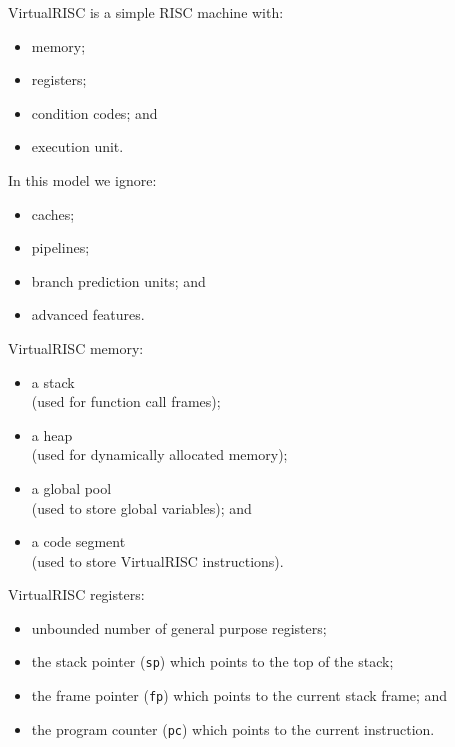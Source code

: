 \begin{slide*}
VirtualRISC is a simple RISC machine with:
\begin{itemize}
\item memory;
\item registers;
\item condition codes; and
\item execution unit.
\end{itemize}

In this model we ignore:
\begin{itemize}
\item caches;
\item pipelines;
\item branch prediction units; and
\item advanced features.
\end{itemize}


\vfil
\end{slide*}

\begin{slide*}
VirtualRISC memory:
\begin{itemize}
\item a stack\\(used for function call frames);
\item a heap\\ (used for dynamically allocated memory);
\item a global pool\\(used to store global variables); and
\item a code segment\\(used to store VirtualRISC instructions).
\end{itemize}
\vfil
\end{slide*}

\begin{slide*}
VirtualRISC registers:
\begin{itemize}
\item unbounded number of general purpose registers;
\item the stack pointer ({\tt sp}) which points to the top of the stack;
\item the frame pointer ({\tt fp}) which points to the current stack frame; and
\item the program counter ({\tt pc}) which points to the current instruction.
\end{itemize}
\vfil
\end{slide*}

